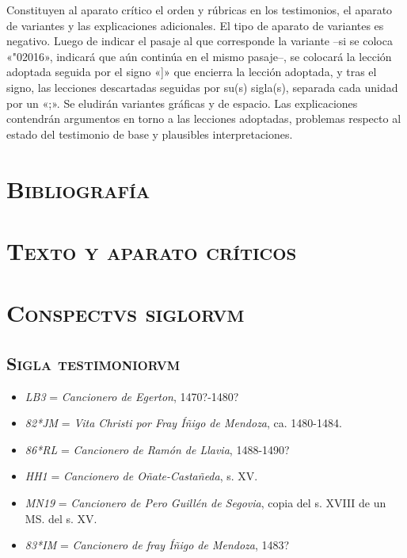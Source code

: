 \documentclass[11pt,a4paper,twoside]{article}
\newcommand{\comillas}[1]{«#1»}
\newcommand{\eg}{{\emph{LB3}}}
\newcommand{\jm}{\emph{82*JM}}
\newcommand{\rl}{\emph{86*RL}}
\newcommand{\hh}{\emph{HH1}}
\newcommand{\mn}{\emph{MN19}}
\newcommand{\im}{\emph{83*IM}}
\begin{document}
%
Constituyen al aparato crítico el orden y rúbricas en los testimonios, el aparato de variantes y las explicaciones adicionales. El tipo de aparato de variantes es negativo. Luego de indicar el pasaje al que corresponde la variante --si se coloca \comillas{\char"02016}, indicará que aún continúa en el mismo pasaje--, se colocará la lección adoptada seguida por el signo \comillas{]} que encierra la lección adoptada, y tras el signo, las lecciones descartadas seguidas por su(s) sigla(s), separada cada unidad por un \comillas{;}. Se eludirán variantes gráficas y de espacio. Las explicaciones contendrán argumentos en torno a las lecciones adoptadas, problemas respecto al estado del testimonio de base y plausibles interpretaciones.\par

\section*{\centering\normalsize \textsc{Bibliografía}}
\nocite{*}
\printbibliography[heading=none]
\newpage

\section*{\centering\normalsize \textsc{Texto y aparato críticos}}
\newpage

\section*{\centering\normalsize \textsc{Conspectvs siglorvm}}

\subsection*{\centering\small \textsc{Sigla testimoniorvm}}
\vspace*{-2.5pt}
\begin{itemize}[label=,leftmargin=0.6cm]%
\item {\eg} = \emph{Cancionero de Egerton}, 1470?-1480?
\item {\jm} = \emph{Vita Christi por Fray Íñigo de Mendoza}, ca. 1480-1484.
\item {\rl} = \emph{Cancionero de Ramón de Llavia}, 1488-1490?
\item {\hh} = \emph{Cancionero de Oñate-Castañeda}, s. XV.
\item {\mn} = \emph{Cancionero de Pero Guillén de Segovia}, copia del s. XVIII de un MS. del s. XV.
\item {\im} = \emph{Cancionero de fray Íñigo de Mendoza}, 1483?%
\end{itemize}
\end{document}
